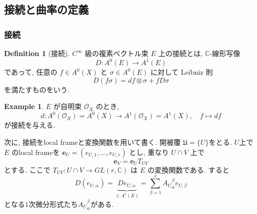 \documentclass[dvipdfmx,a4paper,11pt]{article} %
\theoremstyle{definition}
\newtheorem{defn}[thm]{Definition}
\newtheorem{ex}[thm]{Example}
\theoremstyle{remark}
\numberwithin{equation}{section}
\begin{document}
\subsection{接続と曲率の定義}

\subsubsection{接続}
\begin{defn}[接続]
\(C^\infty\) 級の複素ベクトル束
\(E\) 上の接続とは, \(\mathbb{C}\)-線形写像
\[
D\colon A^0(E)\longrightarrow A^1(E)
\]
であって, 任意の \(f\in A^0(X)\) と \(\sigma\in A^0(E)\) に対して Leibniz 則
\[
D(f\sigma)=df\otimes \sigma+fD\sigma
\]
を満たすものをいう.
\end{defn}

\begin{ex}
\(E\) が自明束 \(\mathcal{O}_X\) のとき,
\[
d\colon A^0(\mathcal{O}_X)=A^0(X)\longrightarrow A^1(\mathcal{O}_X)=A^1(X),
\quad f \mapsto df
\]
が接続を与える.
\end{ex}


次に, 接続をlocal frameと変換関数を用いて書く. 開被覆 \(\mathfrak{U}=\{U\}\)をとる. $U$上で \(E\) のlocal frameを
\(
\mathbf{e}_U=(e_{U,1},\ldots,e_{U,r})
\)
とし, 重なり \(U\cap V\) 上で
\[
\mathbf{e}_V=\mathbf{e}_U T_{UV}
\]
とする. ここで
\(
T_{UV}\colon U\cap V\longrightarrow GL(r,\mathbb{C})
\)
は \(E\) の変換関数である. 
すると
\begin{equation}
\label{eq-defn-connection}
D(e_{U,\alpha})=\underbrace{De_{U,\alpha}}_{\in A^1(E)}
=\sum_{\beta=1}^{r}{A_{U}}^{\beta}_{\alpha}e_{U,\beta}
\end{equation}
となる$1$次微分形式たち${A_{U}}^{\beta}_{\alpha}$がある. 
\end{document}

